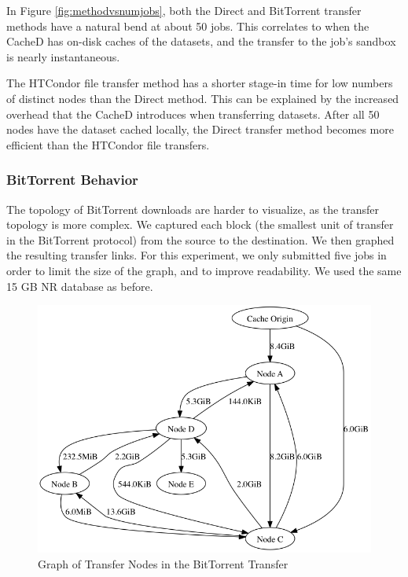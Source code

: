 In Figure \ref{fig:methodvsnumjobs}, both the Direct and BitTorrent transfer methods have a natural bend at about 50 jobs.  This correlates to when the CacheD has on-disk caches of the datasets, and the transfer to the job's sandbox is nearly instantaneous.  

The HTCondor file transfer method has a shorter stage-in time for low numbers of distinct nodes than the Direct method.  This can be explained by the increased overhead that the CacheD introduces when transferring datasets.  After all 50 nodes have the dataset cached locally, the Direct transfer method becomes more efficient than the HTCondor file transfers.

\subsubsection{BitTorrent Behavior}

The topology of BitTorrent downloads are harder to visualize, as the transfer topology is more complex. We captured each block (the smallest unit of transfer in the BitTorrent protocol) from the source to the destination.  We then graphed the resulting transfer links.  For this experiment, we only submitted five jobs in order to limit the size of the graph, and to improve readability.  We used the same 15 GB NR database as before.

\begin{figure}[h!t]
	
\centering
\includegraphics[width=\textwidth]{images/verbose_group_mod.png}
\caption{Graph of Transfer Nodes in the BitTorrent Transfer}
\label{fig:bittorrenttransfernodes}
	
\end{figure}

